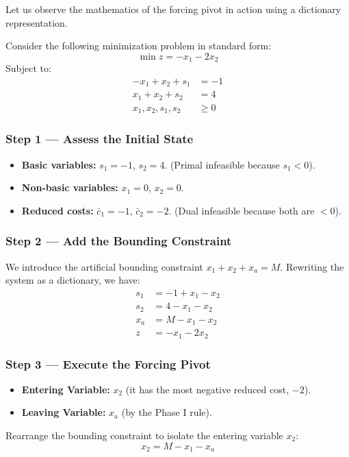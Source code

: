 \documentclass[11pt, a4paper]{article}
\begin{document}
Let us observe the mathematics of the forcing pivot in action using a dictionary representation.

\begin{example}
Consider the following minimization problem in standard form:
\[
\min z = -x_1 - 2x_2
\]
Subject to:
\begin{align*}
-x_1 + x_2 + s_1 &= -1 \\
x_1 + x_2 + s_2 &= 4 \\
x_1, x_2, s_1, s_2 &\ge 0
\end{align*}

\subsubsection*{Step 1 --- Assess the Initial State}
\begin{itemize}[itemsep=2pt]
    \item \textbf{Basic variables:} $s_1 = -1$, $s_2 = 4$. (Primal infeasible because $s_1 < 0$).
    \item \textbf{Non-basic variables:} $x_1 = 0$, $x_2 = 0$.
    \item \textbf{Reduced costs:} $\bar{c}_1 = -1$, $\bar{c}_2 = -2$. (Dual infeasible because both are $< 0$).
\end{itemize}

\subsubsection*{Step 2 --- Add the Bounding Constraint}
We introduce the artificial bounding constraint $x_1 + x_2 + x_a = M$. Rewriting the system as a dictionary, we have:
\begin{align*}
s_1 &= -1 + x_1 - x_2 \\
s_2 &= 4 - x_1 - x_2 \\
x_a &= M - x_1 - x_2 \\
z   &= -x_1 - 2x_2
\end{align*}

\subsubsection*{Step 3 --- Execute the Forcing Pivot}
\begin{itemize}[itemsep=2pt]
    \item \textbf{Entering Variable:} $x_2$ (it has the most negative reduced cost, $-2$).
    \item \textbf{Leaving Variable:} $x_a$ (by the Phase I rule).
\end{itemize}
Rearrange the bounding constraint to isolate the entering variable $x_2$:
\[
x_2 = M - x_1 - x_a
\]


\end{example}
\end{document}
